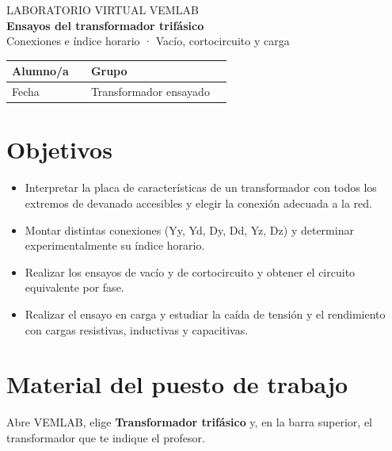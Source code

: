 \documentclass[11pt,a4paper]{article}
\begin{document}
\begin{center}
  {\sffamily\small\color{acento} LABORATORIO VIRTUAL VEMLAB}\\[4pt]
  {\sffamily\LARGE\bfseries Ensayos del transformador trifásico}\\[4pt]
  {\sffamily\large Conexiones e índice horario · Vacío, cortocircuito y carga}
\end{center}

\vspace{6pt}
\begin{tabularx}{\textwidth}{|l|X|l|X|}
  \hline
  \textsf{Alumno/a} & & \textsf{Grupo} & \\ \hline
  \textsf{Fecha} & & \textsf{Transformador ensayado} & \\ \hline
\end{tabularx}

\section{Objetivos}
\begin{itemize}
  \item Interpretar la placa de características de un transformador con todos los extremos de devanado accesibles y elegir la conexión adecuada a la red.
  \item Montar distintas conexiones (Yy, Yd, Dy, Dd, Yz, Dz) y determinar experimentalmente su índice horario.
  \item Realizar los ensayos de vacío y de cortocircuito y obtener el circuito equivalente por fase.
  \item Realizar el ensayo en carga y estudiar la caída de tensión y el rendimiento con cargas resistivas, inductivas y capacitivas.
\end{itemize}

\section{Material del puesto de trabajo}
Abre VEMLAB, elige \textbf{Transformador trifásico} y, en la barra superior, el transformador que te indique el profesor.
\end{document}

